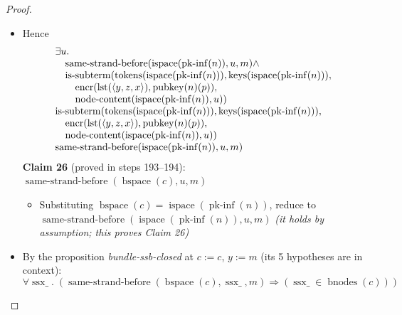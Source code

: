 \documentclass[11pt]{article}
\theoremstyle{plain}
\begin{document}
\begin{proof}
\begin{itemize}[leftmargin=2.8em, itemsep=4pt, parsep=1pt]
\begin{itemize}[leftmargin=2.8em, itemsep=4pt, parsep=1pt]
  \item[\textbf{189--192}] Hence 
\begin{equation*}
\begin{array}{@{}l@{}}
\begin{array}{@{}l@{}} \exists u. \\ \quad \operatorname{same\text{-}strand\text{-}before}(\operatorname{ispace}(\operatorname{pk\text{-}inf}(n)), u, m) \wedge \\ \quad \operatorname{is\text{-}subterm}(\operatorname{tokens}(\operatorname{ispace}(\operatorname{pk\text{-}inf}(n))), \operatorname{keys}(\operatorname{ispace}(\operatorname{pk\text{-}inf}(n))), \\ \quad \quad \operatorname{encr}(\operatorname{lst}(\langle y, z, x \rangle), \operatorname{pubkey}(n)(p)), \\ \quad \quad \operatorname{node\text{-}content}(\operatorname{ispace}(\operatorname{pk\text{-}inf}(n)), u)) \end{array} \\
\begin{array}{@{}l@{}} \operatorname{is\text{-}subterm}(\operatorname{tokens}(\operatorname{ispace}(\operatorname{pk\text{-}inf}(n))), \operatorname{keys}(\operatorname{ispace}(\operatorname{pk\text{-}inf}(n))), \\ \quad \operatorname{encr}(\operatorname{lst}(\langle y, z, x \rangle), \operatorname{pubkey}(n)(p)), \\ \quad \operatorname{node\text{-}content}(\operatorname{ispace}(\operatorname{pk\text{-}inf}(n)), u)) \end{array} \\
\operatorname{same\text{-}strand\text{-}before}(\operatorname{ispace}(\operatorname{pk\text{-}inf}(n)), u, m)
\end{array}
\end{equation*}
\textbf{Claim 26} (proved in steps 193--194): $\operatorname{same\text{-}strand\text{-}before}(\operatorname{bspace}(c), u, m)$
  \begin{itemize}[leftmargin=2.8em, itemsep=4pt, parsep=1pt]
  \item[\textbf{193--194}] Substituting $\operatorname{bspace}(c) = \operatorname{ispace}(\operatorname{pk\text{-}inf}(n))$, reduce to $\operatorname{same\text{-}strand\text{-}before}(\operatorname{ispace}(\operatorname{pk\text{-}inf}(n)), u, m)$  \emph{(it holds by assumption; this proves Claim 26)}
  \end{itemize}
  \item[\textbf{195}] By the proposition \emph{bundle-ssb-closed} at $c := c$, $y := m$ (its 5 hypotheses are in context):
\begin{equation*}
\forall \operatorname{ssx\_}.\; (\operatorname{same\text{-}strand\text{-}before}(\operatorname{bspace}(c), \operatorname{ssx\_}, m) \Rightarrow (\operatorname{ssx\_} \in \operatorname{bnodes}(c)))
\end{equation*}


\end{itemize}
\end{itemize}
\end{proof}
\end{document}
